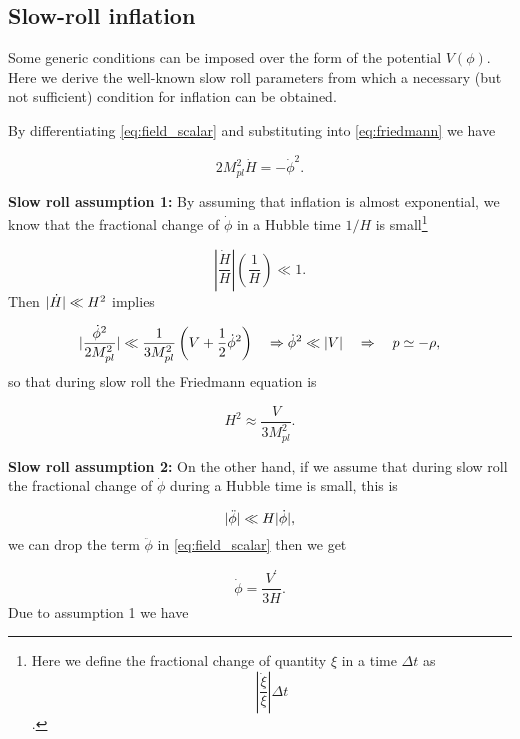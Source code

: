 \documentclass[12pt,letterpaper,twoside]{book}
\DeclarePairedDelimiter\abs{\lvert}{\rvert}%
\begin{document}
\subsection{Slow-roll inflation}

Some generic conditions can be imposed  over the form of the potential
$V(\phi)$.  Here we derive the well-known slow roll parameters from which a
necessary (but not sufficient) condition for inflation can be obtained.

By differentiating  \eqref{eq:field_scalar} and substituting into
\eqref{eq:friedmann} we have

\begin{equation}\label{eq:Hdot_phidot_rel}
    2 M_{pl}^2 \dot{H} = - \dot{\phi}^2.
\end{equation}

\textbf{Slow roll assumption 1:}  By assuming that inflation is almost
exponential, we know that the fractional change of $ \dot{ \phi}$ in a Hubble
time $1/H$ is small\footnote{Here we define the fractional change of quantity
    $\xi$ in a time $\Delta t$ as \[ \left| \frac{\dot{\xi}}{\xi} \right| \Delta
        t\].}

\begin{equation}
    \left| \frac{ \dot{H}}{H} \right| \left(\frac{1}{H}\right) \ll 1.
\end{equation}
Then $\abs{\dot{H}} \ll H^2$ implies

\begin{equation}
    \abs{\frac{\dot{ \phi}^2}{2 M_{pl}^2 }} \ll \frac{1}{3 M_{pl}^2} \left(V+\frac{1}{2} \dot{\phi}^2\right)
    \quad \Rightarrow \dot{\phi}^2 \ll \abs{V}
    \quad \Rightarrow \quad p\simeq -\rho,
\end{equation}
so that during slow roll the Friedmann equation is

\begin{equation}
    H^2 \approx \frac{V}{3 M_{pl}^2}.
\end{equation}

\textbf{Slow roll assumption 2:} On the other hand, if we assume that during
slow roll the fractional change of $ \dot{\phi}$ during a Hubble time is small,
this is

\begin{equation}
    \abs{ \ddot{\phi}}  \ll  H\abs{ \dot{\phi}},
\end{equation}
 we can drop the term $ \ddot{\phi}$ in \eqref{eq:field_scalar} then we get

\begin{equation}
    \dot{\phi}=\frac{V^\prime}{3H}.
\end{equation}
Due to assumption 1 we have
\end{document}
